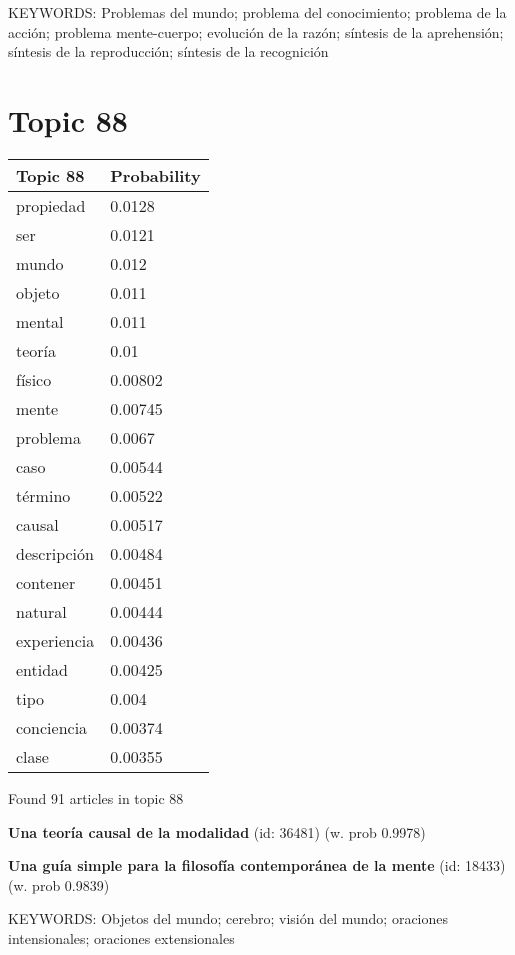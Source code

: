 \documentclass{article}
\begin{document}
KEYWORDS:
Problemas del mundo; problema del conocimiento; problema de la acción; problema mente-cuerpo; evolución de la razón; síntesis de la aprehensión; síntesis de la reproducción; síntesis de la recognición

\vfill
\newpage


\centering
\thispagestyle{empty}
\section*{Topic 88}\vfill
\begin{tabular}{ll}
\toprule
    Topic 88 & Probability \\
\midrule
   propiedad &      0.0128 \\
         ser &      0.0121 \\
       mundo &       0.012 \\
      objeto &       0.011 \\
      mental &       0.011 \\
      teoría &        0.01 \\
      físico &     0.00802 \\
       mente &     0.00745 \\
    problema &      0.0067 \\
        caso &     0.00544 \\
     término &     0.00522 \\
      causal &     0.00517 \\
 descripción &     0.00484 \\
    contener &     0.00451 \\
     natural &     0.00444 \\
 experiencia &     0.00436 \\
     entidad &     0.00425 \\
        tipo &       0.004 \\
  conciencia &     0.00374 \\
       clase &     0.00355 \\
\bottomrule
\end{tabular}

\vfill
Found 91 articles in topic 88
\vfill

\textbf{Una teoría causal de la modalidad} (id: 36481)
 (w. prob 0.9978)
\vfill

\textbf{Una guía simple para la filosofía contemporánea de la mente} (id: 18433)
 (w. prob 0.9839)


KEYWORDS:
Objetos del mundo; cerebro; visión del mundo; oraciones intensionales; oraciones extensionales
\vfill
\end{document}
